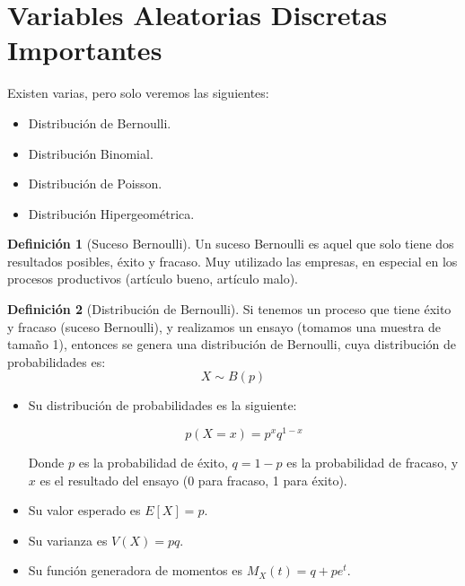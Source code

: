 \documentclass{article}
\theoremstyle{definition}
\newtheorem{definition}{Definición}[section]
\theoremstyle{plain}
\theoremstyle{remark}
\begin{document}
\newpage

\section{Variables Aleatorias Discretas Importantes}

Existen varias, pero solo veremos las  siguientes:

\begin{itemize}
\item Distribución de Bernoulli.
\item Distribución Binomial.
\item Distribución de Poisson.
\item Distribución Hipergeométrica.
\end{itemize}

\begin{definition}[Suceso Bernoulli]
Un suceso Bernoulli es aquel que solo tiene dos resultados posibles, éxito y fracaso. Muy utilizado las empresas, en especial en los procesos productivos (artículo bueno, artículo malo).
\end{definition}

\begin{definition}[Distribución de Bernoulli]
Si tenemos un proceso que tiene éxito y fracaso (suceso Bernoulli), y realizamos un ensayo (tomamos una muestra de tamaño 1), entonces se genera una distribución de Bernoulli, cuya distribución de probabilidades es:
\[
X \sim B(p)
\]

\begin{itemize}
  \item Su distribución de probabilidades es la siguiente:

\[
p(X = x) = p^x q^{1-x}
\]

Donde $p$ es la probabilidad de éxito, $q = 1 - p$ es la probabilidad de fracaso, y $x$ es el resultado del ensayo (0 para fracaso, 1 para éxito).

\item Su valor esperado es $E[X] = p$.
\item Su varianza es $V(X) = pq$.
\item Su función generadora de momentos es $M_X(t) = q + pe^{t}$.
\end{itemize}

\end{definition}
\end{document}
